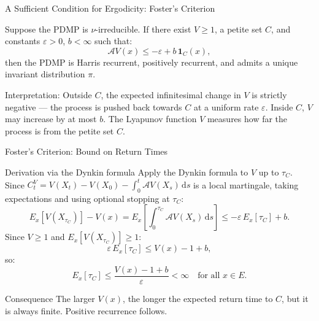 \documentclass[aspectratio=169]{beamer}
\begin{document}
\begin{frame}{A Sufficient Condition for Ergodicity: Foster's Criterion}

  \begin{theorem}
    Suppose the PDMP is $\nu$-irreducible. If there exist $V \geq 1$,
    a petite set $C$, and constants $\varepsilon > 0$, $b < \infty$
    such that:
    \[
      \mathcal{A}V(x) \leq -\varepsilon + b\,\mathbf{1}_C(x),
    \]
    then the PDMP is Harris recurrent, positively recurrent, and
    admits a unique invariant distribution $\pi$.
  \end{theorem}

  \vfill
  \alert{Interpretation}: 
    Outside $C$, the expected infinitesimal change in $V$ is strictly
    negative --- the process is pushed back towards $C$ at a uniform
    rate $\varepsilon$. Inside $C$, $V$ may increase by at most $b$.
    The Lyapunov function $V$ measures how far the process is from
    the petite set $C$.
  
\end{frame}

\begin{frame}{Foster's Criterion: Bound on Return Times}

  \begin{block}{Derivation via the Dynkin formula}
    Apply the Dynkin formula to $V$ up to $\tau_C$. Since
    $C_t^V = V(X_t) - V(X_0) - \int_0^t \mathcal{A}V(X_s)\,\mathrm{d}s$
    is a local martingale, taking expectations and using optional
    stopping at $\tau_C$:
    \[
      E_x[V(X_{\tau_C})] - V(x)
      = E_x\!\left[\int_0^{\tau_C} \mathcal{A}V(X_s)\,\mathrm{d}s\right]
      \leq -\varepsilon\, E_x[\tau_C] + b.
    \]
    Since $V \geq 1$ and $E_x[V(X_{\tau_C})] \geq 1$:
    \[
      \varepsilon\, E_x[\tau_C] \leq V(x) - 1 + b,
    \]
    so:
    \[
      E_x[\tau_C] \leq \frac{V(x) - 1 + b}{\varepsilon} < \infty
      \quad \text{for all } x \in E.
    \]
  \end{block}

  \bigskip
  \begin{block}{Consequence}
    The larger $V(x)$, the longer the expected return time to $C$,
    but it is always finite. Positive recurrence follows.
  \end{block}

\end{frame}
\end{document}
